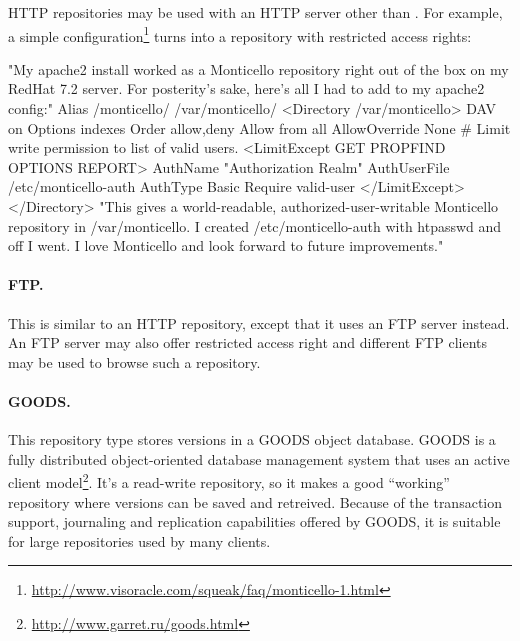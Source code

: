 \documentclass[a4paper,10pt,twoside]{book}
\begin{document}
HTTP repositories may be used with an HTTP server other than . For example, a simple configuration\footnote{\url{http://www.visoracle.com/squeak/faq/monticello-1.html}} turns  into a \Mont repository with restricted access rights:

\begin{code}{}
"My apache2 install worked as a Monticello repository right out of the box on my
RedHat 7.2 server.  For posterity's sake, here's all I had to add to my apache2 config:"
Alias /monticello/ /var/monticello/
<Directory /var/monticello>
  DAV on
  Options indexes
  Order allow,deny
  Allow from all
  AllowOverride None
  # Limit write permission to list of valid users.
  <LimitExcept GET PROPFIND OPTIONS REPORT>
    AuthName "Authorization Realm"
    AuthUserFile /etc/monticello-auth
    AuthType Basic
    Require valid-user
  </LimitExcept>
</Directory>
"This gives a world-readable, authorized-user-writable Monticello repository in
/var/monticello.  I created /etc/monticello-auth with htpasswd and off I went.
I love Monticello and look forward to future improvements."
\end{code}

\paragraph{FTP.} This is similar to an HTTP repository, except that it uses an FTP server instead. An FTP server may also offer restricted access right and different FTP clients may be used to browse such a \Mont repository.

\paragraph{GOODS.}
This repository type stores versions in a GOODS object database.
GOODS is a fully distributed object-oriented database management system that uses an active client model\footnote{\url{http://www.garret.ru/goods.html}}.
It's a read-write repository, so it makes a good ``working'' repository where versions can be saved and retreived. Because of the transaction support, journaling and replication capabilities offered by GOODS, it is suitable for large repositories used by many clients.  

\end{document}
